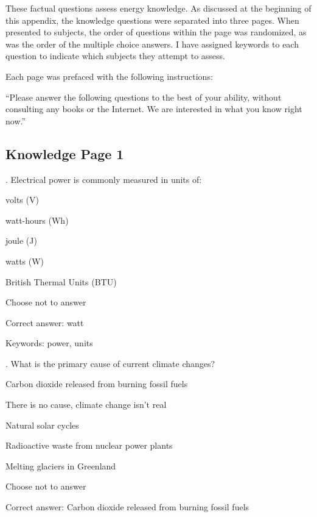 These factual questions assess energy knowledge. As discussed at the beginning of this appendix, the knowledge questions were separated into three pages. When presented to subjects, the order of questions within the page was randomized, as was the order of the multiple choice answers. I have assigned keywords to each question to indicate which subjects they attempt to assess.

Each page was prefaced with the following instructions:

``Please answer the following questions to the best of your ability, without consulting any books or the Internet. We are interested in what you know right now.''

\subsection{Knowledge Page 1}

. Electrical power is commonly measured in units of:

\begin{answer}
	\item volts (V)
	\item watt-hours (Wh)
	\item joule (J)
	\item watts (W)
	\item British Thermal Units (BTU)
	\item Choose not to answer
\end{answer}

Correct answer: watt

Keywords: power, units

\vspace{5 mm}
. What is the primary cause of current climate changes?

\begin{answer}
	\item Carbon dioxide released from burning fossil fuels
	\item There is no cause, climate change isn't real
	\item Natural solar cycles
	\item Radioactive waste from nuclear power plants
	\item Melting glaciers in Greenland
	\item Choose not to answer
\end{answer}

Correct answer: Carbon dioxide released from burning fossil fuels

